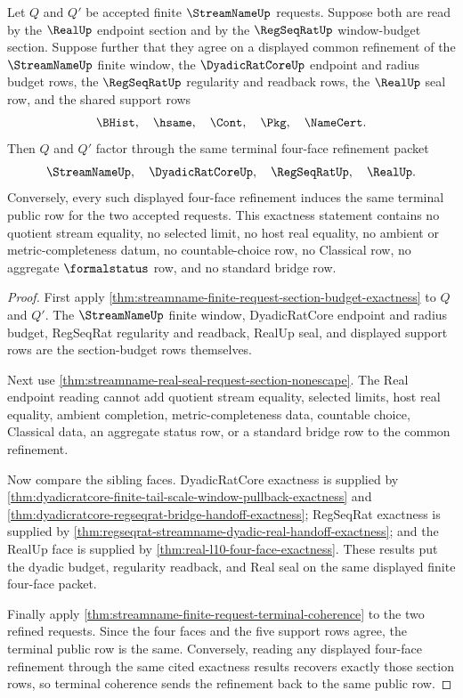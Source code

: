 \begin{theorem}
\label{thm:streamname-finite-request-common-refinement-exactness}
Let $Q$ and $Q'$ be accepted finite $\StreamNameUp$ requests. Suppose both are
read by the $\RealUp$ endpoint section and by the $\RegSeqRatUp$
window-budget section. Suppose further that they agree on a displayed common
refinement of the $\StreamNameUp$ finite window, the $\DyadicRatCoreUp$
endpoint and radius budget rows, the $\RegSeqRatUp$ regularity and readback
rows, the $\RealUp$ seal row, and the shared support rows
$$
\BHist,\quad \hsame,\quad \Cont,\quad \Pkg,\quad \NameCert.
$$
Then $Q$ and $Q'$ factor through the same terminal four-face refinement
packet
$$
\StreamNameUp,\quad \DyadicRatCoreUp,\quad \RegSeqRatUp,\quad \RealUp.
$$
Conversely, every such displayed four-face refinement induces the same
terminal public row for the two accepted requests. This exactness statement
contains no quotient stream equality, no selected limit, no host real
equality, no ambient or metric-completeness datum, no countable-choice row, no
Classical row, no aggregate $\formalstatus$ row, and no standard bridge row.
\end{theorem}
\begin{proof}
First apply
\autoref{thm:streamname-finite-request-section-budget-exactness} to $Q$ and
$Q'$. The $\StreamNameUp$ finite window, DyadicRatCore endpoint and radius
budget, RegSeqRat regularity and readback, RealUp seal, and displayed support
rows are the section-budget rows themselves.

Next use
\autoref{thm:streamname-real-seal-request-section-nonescape}. The Real
endpoint reading cannot add quotient stream equality, selected limits, host
real equality, ambient completion, metric-completeness data, countable choice,
Classical data, an aggregate status row, or a standard bridge row to the
common refinement.

Now compare the sibling faces. DyadicRatCore exactness is supplied by
\autoref{thm:dyadicratcore-finite-tail-scale-window-pullback-exactness} and
\autoref{thm:dyadicratcore-regseqrat-bridge-handoff-exactness}; RegSeqRat
exactness is supplied by
\autoref{thm:regseqrat-streamname-dyadic-real-handoff-exactness}; and the
RealUp face is supplied by \autoref{thm:real-l10-four-face-exactness}. These
results put the dyadic budget, regularity readback, and Real seal on the same
displayed finite four-face packet.

Finally apply
\autoref{thm:streamname-finite-request-terminal-coherence} to the two refined
requests. Since the four faces and the five support rows agree, the terminal
public row is the same. Conversely, reading any displayed four-face refinement
through the same cited exactness results recovers exactly those section rows,
so terminal coherence sends the refinement back to the same public row.
\end{proof}

